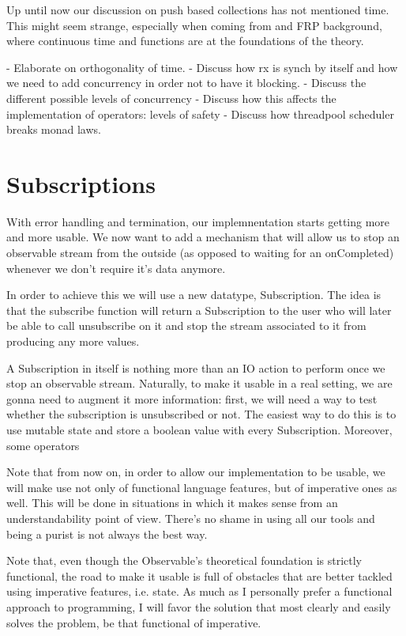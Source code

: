 Up until now our discussion on push based collections has not mentioned time. This might seem strange, especially when coming from and FRP background, where continuous time and functions are at the foundations of the theory. 

- Elaborate on orthogonality of time.
- Discuss how rx is synch by itself and how we need to add concurrency in order not to have it blocking. 
- Discuss the different possible levels of concurrency
- Discuss how this affects the implementation of operators: levels of safety
- Discuss how threadpool scheduler breaks monad laws. 
\section{Subscriptions}


With error handling and termination, our implemnentation starts getting more and more usable. We now want to add a mechanism that will allow us to stop an observable stream from the outside (as opposed to waiting for an onCompleted) whenever we don't require it's data anymore. 

In order to achieve this we will use a new datatype, Subscription. The idea is that the subscribe function will return a Subscription to the user who will later be able to call unsubscribe on it and stop the stream associated to it from producing any more values.


A Subscription in itself is nothing more than an IO action to perform once we stop an observable stream. Naturally, to make it usable in a real setting, we are gonna need to augment it more information: first, we will need a way to test whether the subscription is unsubscribed or not. The easiest way to do this is to use mutable state and store a boolean value with every Subscription. Moreover, some operators 

Note that from now on, in order to allow our implementation to be usable, we will make use not only of functional language features, but of imperative ones as well. This will be done in situations in which it makes sense from an understandability point of view. There's no shame in using all our tools and being a purist is not always the best way.

Note that, even though the Observable's theoretical foundation is strictly functional, the road to make it usable is full of obstacles that are better tackled using imperative features, i.e. state. As much as I personally prefer a functional approach to programming, I will favor the solution that most clearly and easily solves the problem, be that functional of imperative.


